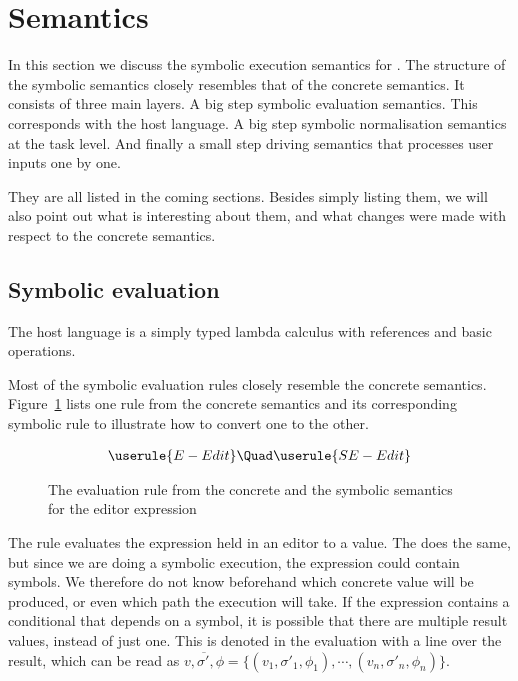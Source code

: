 

\section{Semantics}
\label{sec:semantics}

In this section we discuss the symbolic execution semantics for \TOPHAT.
The structure of the symbolic semantics closely resembles that of the concrete semantics.
It consists of three main layers.
A big step symbolic evaluation semantics.
This corresponds with the host language.
A big step symbolic normalisation semantics at the task level.
And finally a small step driving semantics that processes user inputs one by one.

They are all listed in the coming sections.
Besides simply listing them, we will also point out what is interesting about them,
and what changes were made with respect to the concrete semantics.

\subsection{Symbolic evaluation}

The host language is a simply typed lambda calculus with references and basic operations.

Most of the symbolic evaluation rules closely resemble the concrete semantics.
Figure~\ref{fig:oldToNewSemantics} lists one rule from the concrete semantics and its corresponding symbolic rule to illustrate how to convert one to the other.

\begin{figure}[h]
  \small
  \begin{gather*}
    \userule{E-Edit}\Quad
    \userule{SE-Edit}
  \end{gather*}
  \caption{The evaluation rule from the concrete and the symbolic semantics for the editor expression}
  \label{fig:oldToNewSemantics}
\end{figure}

The  rule evaluates the expression held in an editor to a value.
The  does the same, but since we are doing a symbolic execution, the expression could contain symbols.
We therefore do not know beforehand which concrete value will be produced, or even which path the execution will take.
If the expression contains a conditional that depends on a symbol, it is possible that there are multiple result values, instead of just one.
This is denoted in the evaluation with a line over the result, which can be read as $\overline{v,\sigma',\phi} = \{(v_1,\sigma'_1,\phi_1),\cdots,(v_n,\sigma'_n,\phi_n)\}$.

